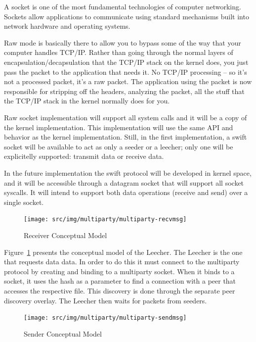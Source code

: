 A socket is one of the most fundamental technologies of computer networking.
Sockets allow applications to communicate using standard mechanisms built into
network hardware and operating systems.

Raw mode is basically there to allow you to bypass some of the way that your
computer handles TCP/IP. Rather than going through the normal layers of
encapsulation/decapsulation that the TCP/IP stack on the kernel does, you just
pass the packet to the application that needs it. No TCP/IP processing -- so
it's not a processed packet, it's a raw packet. The application using
the packet is now responsible for stripping off the headers, analyzing the
packet, all the stuff that the TCP/IP stack in the kernel normally does for
you.

Raw socket implementation will support all system calls and it will be a copy of
the kernel implementation. This implementation will use the same API and
behavior as the kernel implementation. Still, in the first implementation, a
swift socket will be available to act as only a seeder or a leecher;
only one will be explicitelly supported: transmit data or receive data.

In the future implementation the swift protocol will be developed in kernel
space, and it will be accessible through a datagram socket that will support
all socket syscalls. It will intend to support both data operations (receive
and send) over a single socket.

\begin{figure}
  \centering
  \texttt{[image: src/img/multiparty/multiparty-recvmsg]}
  \caption{Receiver Conceptual Model}
  \label{fig:multiparty:multiparty-recvmsg}
\end{figure}

Figure~\ref{fig:multiparty:multiparty-recvmsg} presents the conceptual model
of the Leecher. The Leecher is the one that requests data data. In order
to do this it must connect to the multiparty protocol by creating and binding
to a multiparty socket. When it binds to a socket, it uses the hash as a
parameter to find a connection with a peer that accesses the respective file.
This discovery is done through the separate peer discovery overlay. The
Leecher then waits for packets from seeders.

\begin{figure}
  \centering
  \texttt{[image: src/img/multiparty/multiparty-sendmsg]}
  \caption{Sender Conceptual Model}
  \label{fig:multiparty:multiparty-sendmsg}
\end{figure}

